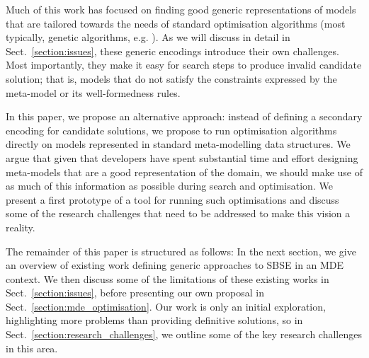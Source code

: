 	Much of this work has focused on finding good generic representations of models that are tailored towards the needs of standard optimisation algorithms (most
	typically, genetic algorithms, e.g. \cite{Deb+02}). As we will discuss in detail in Sect.~\ref{section:issues}, these generic encodings introduce their own
	challenges. Most importantly, they make it easy for search steps to produce invalid candidate solution; that is, models that do not satisfy the constraints
	expressed by the meta-model or its well-formedness rules.
	
	In this paper, we propose an alternative approach: instead of defining a secondary encoding for candidate solutions, we propose to run optimisation algorithms
	directly on models represented in standard meta-modelling data structures. We argue that given that developers have spent substantial time and effort designing
	meta-models that are a good representation of the domain, we should make use of as much of this information as possible during search and optimisation. We
	present a first prototype of a tool for running such optimisations and discuss some of the research challenges that need to be addressed to make this vision a
	reality.
	
	The remainder of this paper is structured as follows: In the next section, we give an overview of existing work defining generic approaches to SBSE in an MDE
	context. We then discuss some of the limitations of these existing works in Sect.~\ref{section:issues}, before presenting our own proposal in 
	Sect.~\ref{section:mde_optimisation}. Our work is only an initial exploration, highlighting more problems than providing definitive solutions, so in 
	Sect.~\ref{section:research_challenges}, we outline some of the key research challenges in this area.